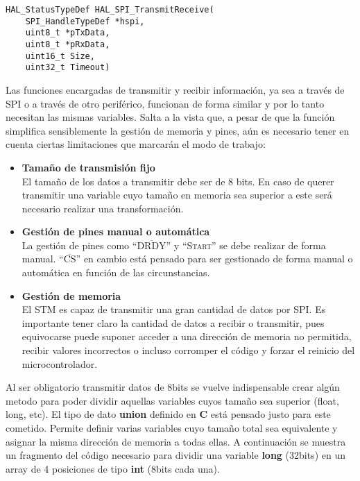 \begin{lstlisting}[label=algoritmo:STM_Transmision_SPI,style = STM-code,frame=single,caption=Transmisión de datos a través de SPI con el STM]
HAL_StatusTypeDef HAL_SPI_TransmitReceive(
	SPI_HandleTypeDef *hspi,
 	uint8_t *pTxData, 
 	uint8_t *pRxData, 
 	uint16_t Size, 
	uint32_t Timeout)
\end{lstlisting}

Las funciones encargadas de transmitir y recibir información, ya sea a través de SPI o a través de otro periférico, funcionan de forma similar y por lo tanto necesitan las mismas variables. Salta a la vista que, a pesar de que la función simplifica sensiblemente la gestión de memoria y pines, aún es necesario tener en cuenta ciertas limitaciones que marcarán el modo de trabajo:
\begin{itemize}
\item \textbf{Tamaño de transmisión fijo}\\
El tamaño de los datos a transmitir debe ser de 8 bits. En caso de querer transmitir una variable cuyo tamaño en memoria sea superior a este será necesario realizar una transformación.
\item \textbf{Gestión de pines manual o automática}\\
La gestión de pines como ``$\overline{\text{DRDY}}$'' y ``\textsc{Start}'' se debe realizar de forma manual. ``$\overline{\text{CS}}$'' en cambio está pensado para ser gestionado de forma manual o automática en función de las circunstancias.
\item \textbf{Gestión de memoria}\\
El STM es capaz de transmitir una gran cantidad de datos por \acrshort{SPI}. Es importante tener claro la cantidad de datos a recibir o transmitir, pues equivocarse puede suponer acceder a una dirección de memoria no permitida, recibir valores incorrectos o incluso corromper el código y forzar el reinicio del microcontrolador.
\end{itemize}

Al ser obligatorio transmitir datos de 8bits se vuelve indispensable crear algún metodo para poder dividir aquellas variables cuyos tamaño sea superior (float, long, etc).
El tipo de dato \textbf{union} definido en \textbf{C} está pensado justo para este cometido. Permite definir varias variables cuyo tamaño total sea equivalente y asignar la misma dirección de memoria a todas ellas. A continuación se muestra un fragmento del código necesario para dividir una variable \textbf{long} (32bits) en un array de 4 posiciones de tipo \textbf{int} (8bits cada una).

